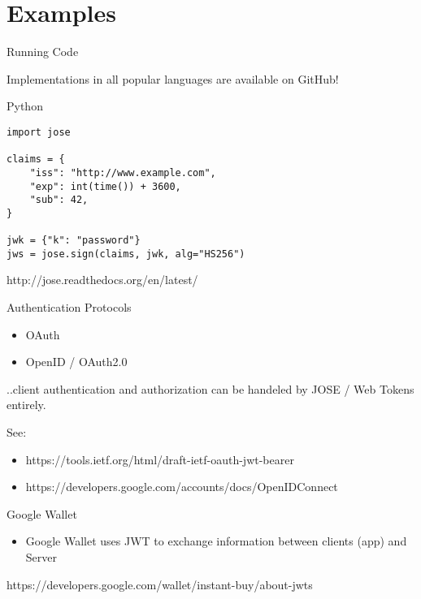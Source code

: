 \section{Examples}\label{examples}

\begin{frame}[fragile]{Running Code}

Implementations in all popular languages are available on GitHub!

\begin{block}{Python}

\small

\begin{verbatim}
import jose

claims = {
    "iss": "http://www.example.com",
    "exp": int(time()) + 3600,
    "sub": 42,
}

jwk = {"k": "password"}
jws = jose.sign(claims, jwk, alg="HS256")
\end{verbatim}

http://jose.readthedocs.org/en/latest/

\end{block}

\end{frame}

\begin{frame}{Authentication Protocols}

\begin{itemize}
\itemsep1pt\parskip0pt
\item
  OAuth
\item
  OpenID / OAuth2.0
\end{itemize}

..client authentication and authorization can be handeled by JOSE / Web
Tokens entirely.

See:

\begin{itemize}
\itemsep1pt\parskip0pt
\item
  https://tools.ietf.org/html/draft-ietf-oauth-jwt-bearer
\item
  https://developers.google.com/accounts/docs/OpenIDConnect
\end{itemize}

\end{frame}

\begin{frame}{Google Wallet}

\begin{itemize}
\itemsep1pt\parskip0pt
\item
  Google Wallet uses JWT to exchange information between clients (app)
  and Server
\end{itemize}

https://developers.google.com/wallet/instant-buy/about-jwts

\end{frame}

